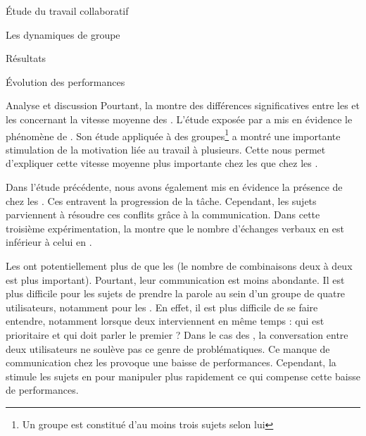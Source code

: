 \documentclass[myfrancais]{mythesis}
\begin{document}
\begin{mypart}{Étude du travail collaboratif}
\begin{mychapter}{Les dynamiques de groupe}
\begin{mysection}{Résultats}
\begin{mysubsection}{Évolution des performances}
\begin{mysubsubsection}{Analyse et discussion}
						Pourtant, la  montre des différences significatives entre les  et les  concernant la vitesse moyenne des .
						L'étude exposée par  a mis en évidence le phénomène de .
						Son étude appliquée à des groupes\footnote{Un groupe est constitué d'au moins trois sujets selon lui} a montré une importante stimulation de la motivation liée au travail à plusieurs.
						Cette  nous permet d'expliquer cette vitesse moyenne plus importante chez les  que chez les .

						Dans l'étude précédente, nous avons également mis en évidence la présence de  chez les .
						Ces  entravent la progression de la tâche.
						Cependant, les sujets parviennent à résoudre ces conflits grâce à la communication.
						Dans cette troisième expérimentation, la  montre que le nombre d'échanges verbaux en  est inférieur à celui en .

						Les  ont potentiellement plus de  que les  (le nombre de combinaisons deux à deux est plus important).
						Pourtant, leur communication est moins abondante.
						Il est plus difficile pour les sujets de prendre la parole au sein d'un groupe de quatre utilisateurs, notamment pour les .
						En effet, il est plus difficile de se faire entendre, notamment lorsque deux  interviennent en même temps : qui est prioritaire et qui doit parler le premier ?
						Dans le cas des , la conversation entre deux utilisateurs ne soulève pas ce genre de problématiques.
						Ce manque de communication chez les  provoque une baisse de performances.
						Cependant, la  stimule les sujets en  pour manipuler plus rapidement ce qui compense cette baisse de performances.


\end{mysubsubsection}
\end{mysubsection}
\end{mysection}
\end{mychapter}
\end{mypart}
\end{document}
